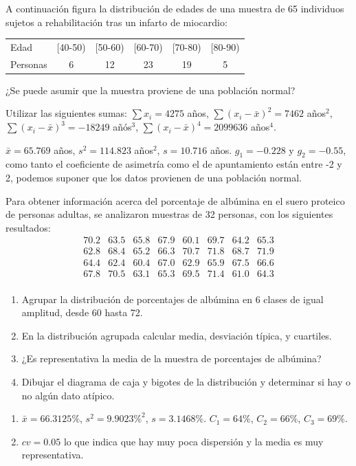 {A continuación figura la distribución de edades de una muestra de 65 individuos sujetos a rehabilitación tras un infarto de miocardio:
\begin{center}
\begin{tabular}{lccccc}
\toprule
Edad & [40-50) & [50-60) & [60-70) & [70-80) & [80-90)  \\
Personas & 6 & 12 & 23 & 19 & 5  \\
\bottomrule
\end{tabular}
\end{center}

¿Se puede asumir que la muestra proviene de una población normal?

Utilizar las siguientes sumas: $\sum x_i= 4275$ años, $\sum (x_i-\bar x)^2=7462$ años$^2$, $\sum (x_i-\bar x)^3=-18249$
añós$^3$, $\sum (x_i-\bar x)^4=2099636$ años$^4$.

}
{
$\bar x= 65.769$ años, $s^2= 114.823$ años$^2$, $s=10.716$ años. $g_1=-0.228$ y $g_2=-0.55$, como tanto el coeficiente de asimetría como el de apuntamiento están entre -2 y 2, podemos suponer que los datos provienen de una población normal.
}
{}


{Para obtener información acerca del porcentaje de albúmina en el suero proteico de personas adultas, se analizaron muestras de 32 personas, con los siguientes resultados:
\[
\begin{array}{cccccccc}
70.2 & 63.5 & 65.8 & 67.9 & 60.1 & 69.7 & 64.2 & 65.3 \\
62.8 & 68.4 & 65.2 & 66.3 & 70.7 & 71.8 & 68.7 & 71.9 \\
64.4 & 62.4 & 60.4 & 67.0 & 62.9 & 65.9 & 67.5 & 66.6 \\
67.8 & 70.5 & 63.1 & 65.3 & 69.5 & 71.4 & 61.0 & 64.3 \\
\end{array}
\]
\begin{enumerate}
\item Agrupar la distribución de porcentajes de albúmina en 6 clases de igual amplitud, desde 60 hasta 72.
\item En la distribución agrupada calcular media, desviación típica, y cuartiles.
\item ¿Es representativa la media de la muestra de porcentajes de albúmina?
\item Dibujar el diagrama de caja y bigotes de la distribución y determinar si hay o no algún dato atípico.
\end{enumerate}
}
{\begin{enumerate}[start=2]
\item $\bar x=66.3125\%$, $s^2=9.9023\%^2$, $s=3.1468\%$. $C_1=64\%$, $C_2=66\%$, $C_3=69\%$.
\item $cv=0.05$ lo que indica que hay muy poca dispersión y la media es muy representativa.
\end{enumerate}
}
{}


